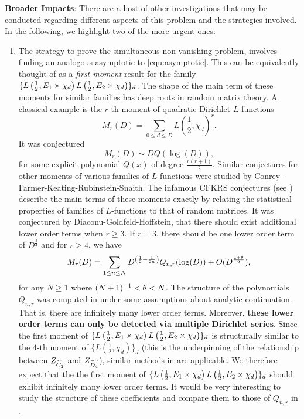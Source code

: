 \documentclass[12pt,reqno,oneside]{amsart}
\begin{document}
\textbf{Broader Impacts}: There are a host of other investigations that may be conducted regarding different aspects of this problem and the strategies involved. In the following, we highlight two of the more urgent ones:

\begin{enumerate}
  \item The strategy to prove the simultaneous non-vanishing problem, involves finding an analogous asymptotic to \cref{equ:asymptotic}. This can be equivalently thought of as a \textit{first moment} result for the family $\{L\left(\frac{1}{2},E_{1} \times \chi_{d}\right)L\left(\frac{1}{2},E_{2} \times \chi_{d}\right)\}_{d}$. The shape of the main term of these moments for similar families has deep roots in random matrix theory. A classical example is the $r$-th moment of quadratic Dirichlet $L$-functions
  \[
      M_{r}(D) = \sum_{0 \le d \le D}L\left(\frac{1}{2},\chi_{d}\right)^{r}.
  \]
  It was conjectured
  \[
    M_{r}(D) \sim DQ(\log(D)),
  \]
  for some explicit polynomial $Q(x)$ of degree $\frac{r(r+1)}{2}$. Similar conjectures for other moments of various families of $L$-functions were studied by Conrey-Farmer-Keating-Rubinstein-Snaith. The infamous CFKRS conjectures (see \cite{CFKRS}) describe the main terms of these moments exactly by relating the statistical properties of families of $L$-functions to that of random matrices. It was conjectured by Diaconu-Goldfeld-Hoffstein, that there should exist additional lower order terms when $r \ge 3$. If $r = 3$, there should be one lower order term of $D^{\frac{3}{4}}$ and for $r \ge 4$, we have
  \[
    M_{r}(D) = \sum_{1 \le n \le N}D^{\left(\frac{1}{2}+\frac{1}{2n}\right)}Q_{n,r}(\log(D))+O(D^{\frac{1+\theta}{2}}),
  \]
  for any $N \ge 1$ where $(N+1)^{-1} < \theta < N$. The structure of the polynomials $Q_{n,r}$ was computed in \cite{DT} under some assumptions about analytic continuation. That is, there are infinitely many lower order terms. Moreover, \textbf{these lower order terms can only be detected via multiple Dirichlet series}. Since the first moment of $\{L\left(\frac{1}{2},E_{1} \times \chi_{d}\right)L\left(\frac{1}{2},E_{2} \times \chi_{d}\right)\}_{d}$ is structurally similar to the $4$-th moment of $\{L\left(\frac{1}{2},\chi_{d}\right)\}_{d}$ (this is the underpinning of the relationship between $Z_{\widetilde{C}_{2}}$ and $Z_{\widetilde{D_{4}}}$), similar methods in \cite{DT} are applicable. We therefore expect that the the first moment of $\{L\left(\frac{1}{2},E_{1} \times \chi_{d}\right)L\left(\frac{1}{2},E_{2} \times \chi_{d}\right)\}_{d}$ should exhibit infinitely many lower order terms. It would be very interesting to study the structure of these coefficients and compare them to those of $Q_{n,r}$ in \cite{DT}.


\end{enumerate}
\end{document}

